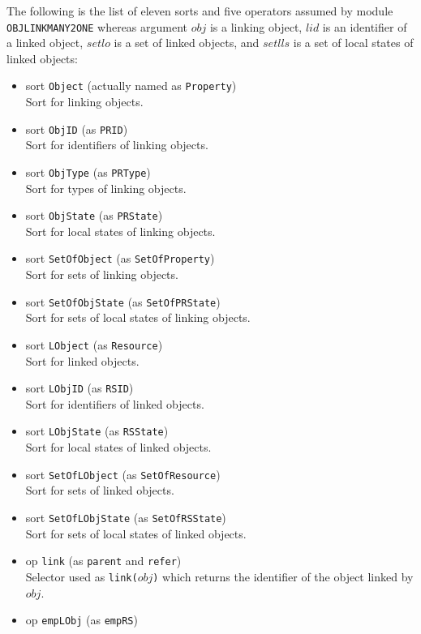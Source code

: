 \documentclass[12pt]{report}
\newcommand{\stt}[1]{{\small{\tt {#1}}}}
\begin{document}
\normalsize
The following is the list of eleven sorts and five operators assumed by
module {\tt OBJLINKMANY2ONE} whereas argument $obj$ is a linking
object, $lid$ is an identifier of a linked object, $setlo$ is a set of
linked objects, and $setlls$ is a set of local states of linked
objects:
\begin{itemize}
\item sort \stt{Object} (actually named as \stt{Property})\\
  Sort for linking objects.
\item sort \stt{ObjID} (as \stt{PRID})\\
  Sort for identifiers of linking objects.
\item sort \stt{ObjType} (as \stt{PRType})\\
  Sort for types of linking objects.
\item sort \stt{ObjState} (as \stt{PRState})\\
  Sort for local states of linking objects.
\item sort \stt{SetOfObject} (as \stt{SetOfProperty})\\
  Sort for sets of linking objects.
\item sort \stt{SetOfObjState} (as \stt{SetOfPRState})\\
  Sort for sets of local states of linking objects.
\item sort \stt{LObject} (as \stt{Resource})\\
  Sort for linked objects.
\item sort \stt{LObjID} (as \stt{RSID})\\
  Sort for identifiers of linked objects.
\item sort \stt{LObjState} (as \stt{RSState})\\
  Sort for local states of linked objects.
\item sort \stt{SetOfLObject} (as \stt{SetOfResource})\\
  Sort for sets of linked objects.
\item sort \stt{SetOfLObjState} (as \stt{SetOfRSState})\\
  Sort for sets of local states of linked objects.
\item op \stt{link} (as \stt{parent} and \stt{refer})\\
  Selector used as \stt{link($obj$)} which returns the identifier of
  the object linked by $obj$.
\item op \stt{empLObj} (as \stt{empRS})\\

\end{itemize}
\end{document}

